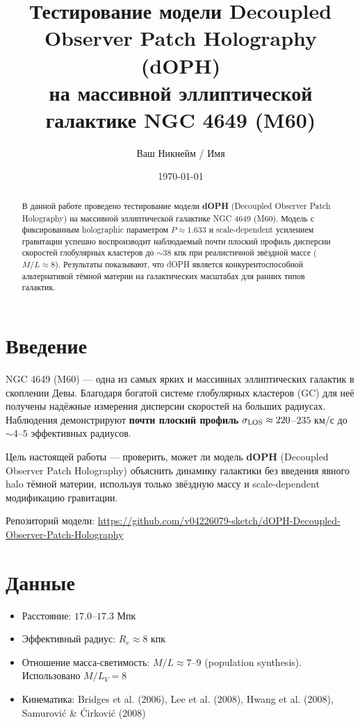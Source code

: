 \documentclass[12pt,a4paper]{article}
\title{Тестирование модели Decoupled Observer Patch Holography (dOPH) \\ на массивной эллиптической галактике NGC 4649 (M60)}
\author{Ваш Никнейм / Имя}
\date{\today}
\begin{document}
\maketitle

\begin{abstract}
В данной работе проведено тестирование модели \textbf{dOPH} (Decoupled Observer Patch Holography) на массивной эллиптической галактике NGC 4649 (M60). 
Модель с фиксированным holographic параметром \( P \approx 1.633 \) и scale-dependent усилением гравитации успешно воспроизводит наблюдаемый почти плоский профиль дисперсии скоростей глобулярных кластеров до \( \sim 38 \) кпк при реалистичной звёздной массе (\( M/L \approx 8 \)). 
Результаты показывают, что dOPH является конкурентоспособной альтернативой тёмной материи на галактических масштабах для ранних типов галактик.
\end{abstract}

\section{Введение}

NGC 4649 (M60) — одна из самых ярких и массивных эллиптических галактик в скоплении Девы. Благодаря богатой системе глобулярных кластеров (GC) для неё получены надёжные измерения дисперсии скоростей на больших радиусах. Наблюдения демонстрируют \textbf{почти плоский профиль} \( \sigma_{\rm LOS} \approx 220 \)--$235$ км/с до \( \sim 4 \)--$5$ эффективных радиусов.

Цель настоящей работы — проверить, может ли модель \textbf{dOPH} (Decoupled Observer Patch Holography) объяснить динамику галактики без введения явного halo тёмной материи, используя только звёздную массу и scale-dependent модификацию гравитации.

Репозиторий модели: \url{https://github.com/v04226079-sketch/dOPH-Decoupled-Observer-Patch-Holography}

\section{Данные}

\begin{itemize}
    \item Расстояние: $17.0$--$17.3$ Мпк
    \item Эффективный радиус: \( R_e \approx 8 \) кпк
    \item Отношение масса-светимость: \( M/L \approx 7 \)--$9$ (population synthesis). Использовано \( M/L_V = 8 \)
    \item Кинематика: Bridges et al. (2006), Lee et al. (2008), Hwang et al. (2008), Samurović \& Ćirković (2008)
\end{itemize}
\end{document}
